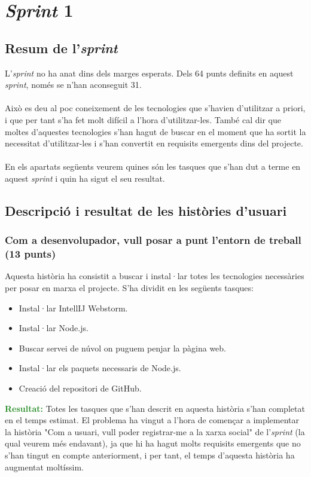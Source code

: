 \documentclass[11pt,catalan,listoffigures,listoftables]{tfgetsinf}
\begin{document}
\section{\textit{Sprint} 1}

\subsection{Resum de l'\textit{sprint}}

L'\textit{sprint} no ha anat dins dels marges esperats. Dels 64 punts definits en aquest \textit{sprint}, només se n'han aconseguit 31.\\ \\
Això es deu al poc coneixement de les tecnologies que s'havien d'utilitzar a priori, i que per tant s'ha fet molt difícil a l'hora d'utilitzar-les. També cal dir que moltes d'aquestes tecnologies s'han hagut de buscar en el moment que ha sortit la necessitat d'utilitzar-les i s'han convertit en requisits emergents dins del projecte.\\ \\
En els apartats següents veurem quines són les tasques que s'han dut a terme en aquest \textit{sprint} i quin ha sigut el seu resultat.

\subsection{Descripció i resultat de les històries d'usuari}

\subsubsection{Com a desenvolupador, vull posar a punt l'entorn de treball (13 punts)}

Aquesta història ha consistit a buscar i instal·lar totes les tecnologies necessàries per posar en marxa el projecte. S'ha dividit en les següents tasques:
\begin{itemize}
\item Instal·lar IntellIJ Webstorm.
\item Instal·lar Node.js.
\item Buscar servei de núvol on puguem penjar la pàgina web.
\item Instal·lar els paquets necessaris de Node.js.
\item Creació del repositori de GitHub.
\end{itemize}
\textcolor{forestgreen}{\textbf{Resultat:}} Totes les tasques que s'han descrit en aquesta història s'han completat en el temps estimat. El problema ha vingut a l'hora de començar a implementar la història "Com a usuari, vull poder registrar-me a la xarxa social" de l'\textit{sprint} (la qual veurem més endavant), ja que hi ha hagut molts requisits emergents que no s'han tingut en compte anteriorment, i per tant, el temps d'aquesta història ha augmentat moltíssim.
\end{document}

